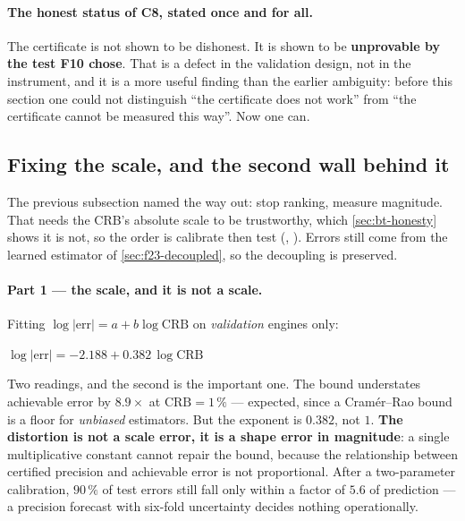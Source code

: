 
\paragraph{The honest status of C8, stated once and for all.} The certificate is not shown to
be dishonest. It is shown to be \textbf{unprovable by the test F10 chose}. That is a defect in
the validation design, not in the instrument, and it is a more useful finding than the earlier
ambiguity: before this section one could not distinguish ``the certificate does not work'' from
``the certificate cannot be measured this way''. Now one can.

\subsection{Fixing the scale, and the second wall behind it}
\label{sec:f24-scale}

The previous subsection named the way out: stop ranking, measure magnitude. That needs the
CRB's absolute scale to be trustworthy, which \cref{sec:bt-honesty} shows it is not, so the
order is calibrate then test (,
). Errors still come from the learned estimator of
\cref{sec:f23-decoupled}, so the decoupling is preserved.

\paragraph{Part 1 --- the scale, and it is not a scale.} Fitting
$\log|\mathrm{err}| = a + b \log \mathrm{CRB}$ on \emph{validation} engines only:

\begin{center}\small
$\log|\mathrm{err}| = -2.188 + 0.382\,\log \mathrm{CRB}$
\end{center}

Two readings, and the second is the important one. The bound understates achievable error by
$\mathbf{8.9\times}$ at $\mathrm{CRB}=1\,\%$ --- expected, since a Cram\'er--Rao bound is a floor
for \emph{unbiased} estimators. But the exponent is $\mathbf{0.382}$, not $1$. \textbf{The
distortion is not a scale error, it is a shape error in magnitude}: a single multiplicative
constant cannot repair the bound, because the relationship between certified precision and
achievable error is not proportional. After a two-parameter calibration, $90\,\%$ of test
errors still fall only within a factor of $\mathbf{5.6}$ of prediction --- a precision forecast
with six-fold uncertainty decides nothing operationally.

